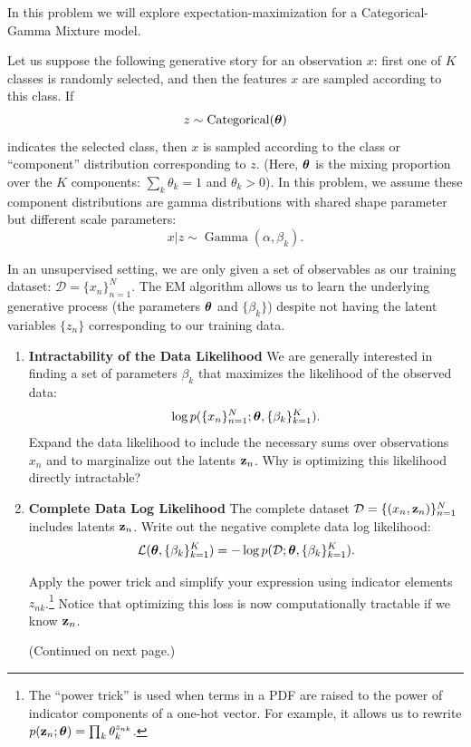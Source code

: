 \documentclass[submit]{harvardml}
\begin{document}
\newpage
\begin{problem}

In this problem we will explore expectation-maximization for a Categorical-Gamma Mixture model.

Let us suppose the following generative story for an observation $x$: first one of $K$ classes is randomly selected, and then the features $x$ are sampled according to this class. If $$z \sim \operatorname{Categorical}(\boldsymbol{\theta})$$ indicates the selected class, then $x$ is sampled according to the class or ``component'' distribution corresponding to $z$. (Here, $\boldsymbol{\theta}$ is the mixing proportion over the $K$ components: $\sum_k \theta_k = 1$ and $ \theta_k > 0$). In this problem, we assume these component distributions are gamma distributions with shared shape parameter but different scale parameters: $$x | z \sim \operatorname{Gamma}(\alpha, \beta_k).$$

In an unsupervised setting, we are only given a set of observables as our training dataset: $\mathcal D = \{x_n\}_{n=1}^N$. The EM algorithm allows us to learn the underlying generative process (the parameters $\boldsymbol{\theta}$ and $\{\beta_k\}$) despite not having the latent variables $\{z_n\}$ corresponding to our training data.

\vspace{2em}

\begin{enumerate}

  \item \textbf{Intractability of the Data Likelihood} We are
    generally interested in finding a set of parameters $\beta_k$ that
    maximizes the likelihood of the observed data: $$\log
    p(\{x_n\}^N_{n=1}; \boldsymbol{\theta}, \{\beta_k\}^K_{k = 1}).$$ Expand the data
    likelihood to include the necessary sums over observations
    $x_n$ and to marginalize out the latents
    $\mathbf{z}_n$. Why is optimizing this likelihood directly
    intractable?

\item \textbf{Complete Data Log Likelihood} The complete dataset
  $\mathcal D = \{(x_n, \mathbf{z}_n)\}_{n=1}^N$ includes latents $\mathbf{z}_n$. Write
  out the negative complete data log likelihood: $$\mathcal{L}(\boldsymbol{\theta}, \{\beta_k\}^K_{k=1}) =  -\log p(\mathcal D; \boldsymbol{\theta}, \{\beta_k\}^K_{k=1}).$$

  Apply the power trick and simplify your expression using indicator elements $z_{n
  k}$.\footnote{The ``power trick'' is used when terms in a PDF are raised to the power of indicator components of a one-hot vector.  For example, it allows us to rewrite $p(\mathbf{z}_n ;  \boldsymbol{\theta}) = \prod_k \theta_k^{z_{nk}}$.} Notice that optimizing this loss is now computationally tractable if we know $\mathbf{z}_n$.

  (Continued on next page.)

\end{enumerate}

\end{problem}
\end{document}
